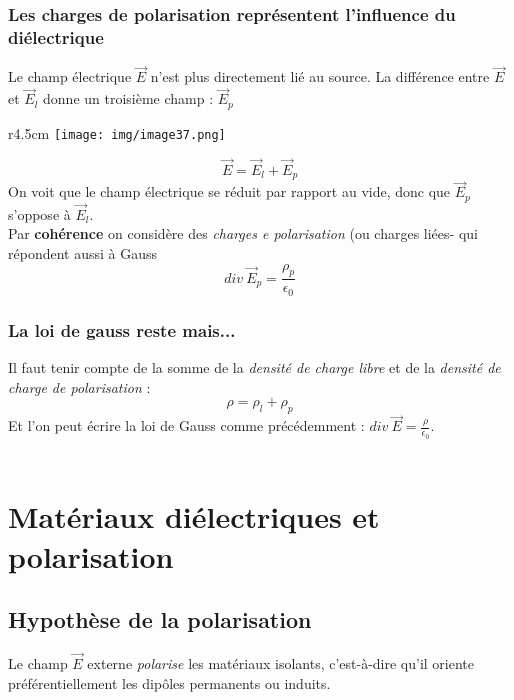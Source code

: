 \documentclass[british,french,11pt, a4paper, openany]{book}
\begin{document}
		\subsubsection{Les charges de polarisation représentent l'influence du diélectrique}
		
		
		Le champ électrique $\vec{E}$ n'est plus directement lié au source. La différence entre $\vec{E}$ et $\vec{E}_l$ donne un troisième champ : $\vec{E}_p$
		\begin{wrapfigure}[15]{r}{4.5cm}
			\texttt{[image: img/image37.png]}
		\end{wrapfigure}
		\begin{equation}
		\vec{E} = \vec{E}_l + \vec{E}_p
		\end{equation}
		On voit que le champ électrique se réduit par rapport au vide, donc que $\vec{E}_p$ s'oppose à $\vec{E}_l$.\\
		Par \textbf{cohérence} on considère des \textit{charges e polarisation} (ou charges liées- qui répondent aussi à Gauss 
		\begin{equation}
		div\ \vec{E}_p = \frac{\rho_p}{\epsilon_0}
		\end{equation}
		
		\subsubsection{La loi de gauss reste mais...}
		Il faut tenir compte de la somme de la \textit{densité de charge libre} et de la \textit{densité de charge de polarisation} :
		\begin{equation}
		\rho = \rho_l + \rho_p
		\end{equation}
		Et l'on peut écrire la loi de Gauss comme précédemment : $div\ \vec{E} = \frac{\rho}{\epsilon_0}$.\\
		
		\
		
		\section{Matériaux diélectriques et polarisation}
		\subsection{Hypothèse de la polarisation}
		Le champ $\vec{E}$ externe \textit{polarise} les matériaux isolants, c'est-à-dire qu'il oriente préférentiellement les dipôles permanents ou induits.
		
\end{document}
